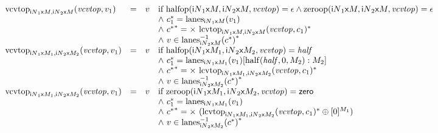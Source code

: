 $$
\begin{array}[t]{@{}lcl@{}l@{}}
{{\mathrm{vcvtop}}}_{{{{\mathsf{i}}{N}}_1}{\mathsf{x}}{M}, {{{\mathsf{i}}{N}}_2}{\mathsf{x}}{M}}({\mathit{vcvtop}}, v_1) & = & v & \quad
\begin{array}[t]{@{}l@{}}
\mbox{if}~ {\mathrm{halfop}}({{{\mathsf{i}}{N}}_1}{\mathsf{x}}{M}, {{{\mathsf{i}}{N}}_2}{\mathsf{x}}{M}, {\mathit{vcvtop}}) = \epsilon \land {\mathrm{zeroop}}({{{\mathsf{i}}{N}}_1}{\mathsf{x}}{M}, {{{\mathsf{i}}{N}}_2}{\mathsf{x}}{M}, {\mathit{vcvtop}}) = \epsilon \\
{\land}~ {c_1^\ast} = {{\mathrm{lanes}}}_{{{{\mathsf{i}}{N}}_1}{\mathsf{x}}{M}}(v_1) \\
{\land}~ {{c^\ast}^\ast} = {\Large\times}~{{{\mathrm{lcvtop}}}_{{{{\mathsf{i}}{N}}_1}{\mathsf{x}}{M}, {{{\mathsf{i}}{N}}_2}{\mathsf{x}}{M}}({\mathit{vcvtop}}, c_1)^\ast} \\
{\land}~ v \in {{{{{\mathrm{lanes}}}_{{{{\mathsf{i}}{N}}_2}{\mathsf{x}}{M}}^{{-1}}}}{({c^\ast})}^\ast} \\
\end{array} \\
{{\mathrm{vcvtop}}}_{{{{\mathsf{i}}{N}}_1}{\mathsf{x}}{M_1}, {{{\mathsf{i}}{N}}_2}{\mathsf{x}}{M_2}}({\mathit{vcvtop}}, v_1) & = & v & \quad
\begin{array}[t]{@{}l@{}}
\mbox{if}~ {\mathrm{halfop}}({{{\mathsf{i}}{N}}_1}{\mathsf{x}}{M_1}, {{{\mathsf{i}}{N}}_2}{\mathsf{x}}{M_2}, {\mathit{vcvtop}}) = {\mathit{half}} \\
{\land}~ {c_1^\ast} = {{\mathrm{lanes}}}_{{{{\mathsf{i}}{N}}_1}{\mathsf{x}}{M_1}}(v_1){}[{\mathrm{half}}({\mathit{half}}, 0, M_2) : M_2] \\
{\land}~ {{c^\ast}^\ast} = {\Large\times}~{{{\mathrm{lcvtop}}}_{{{{\mathsf{i}}{N}}_1}{\mathsf{x}}{M_1}, {{{\mathsf{i}}{N}}_2}{\mathsf{x}}{M_2}}({\mathit{vcvtop}}, c_1)^\ast} \\
{\land}~ v \in {{{{{\mathrm{lanes}}}_{{{{\mathsf{i}}{N}}_2}{\mathsf{x}}{M_2}}^{{-1}}}}{({c^\ast})}^\ast} \\
\end{array} \\
{{\mathrm{vcvtop}}}_{{{{\mathsf{i}}{N}}_1}{\mathsf{x}}{M_1}, {{{\mathsf{i}}{N}}_2}{\mathsf{x}}{M_2}}({\mathit{vcvtop}}, v_1) & = & v & \quad
\begin{array}[t]{@{}l@{}}
\mbox{if}~ {\mathrm{zeroop}}({{{\mathsf{i}}{N}}_1}{\mathsf{x}}{M_1}, {{{\mathsf{i}}{N}}_2}{\mathsf{x}}{M_2}, {\mathit{vcvtop}}) = \mathsf{zero} \\
{\land}~ {c_1^\ast} = {{\mathrm{lanes}}}_{{{{\mathsf{i}}{N}}_1}{\mathsf{x}}{M_1}}(v_1) \\
{\land}~ {{c^\ast}^\ast} = {\Large\times}~({{{\mathrm{lcvtop}}}_{{{{\mathsf{i}}{N}}_1}{\mathsf{x}}{M_1}, {{{\mathsf{i}}{N}}_2}{\mathsf{x}}{M_2}}({\mathit{vcvtop}}, c_1)^\ast} \oplus {{}[0]^{M_1}}) \\
{\land}~ v \in {{{{{\mathrm{lanes}}}_{{{{\mathsf{i}}{N}}_2}{\mathsf{x}}{M_2}}^{{-1}}}}{({c^\ast})}^\ast} \\
\end{array} \\
\end{array}
$$

